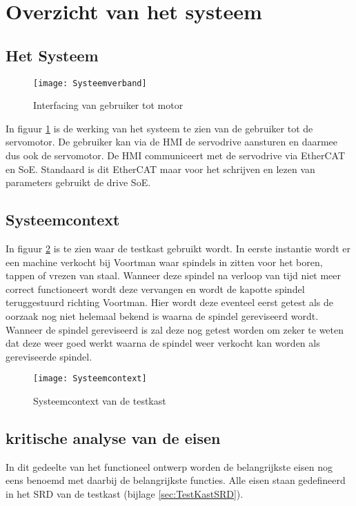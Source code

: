 \section{Overzicht van het systeem}

\subsection{Het Systeem}

\begin{figure}[H]
	\centering
	\texttt{[image: Systeemverband]}
	\label{fig:SysteemVerband}
	\caption{Interfacing van gebruiker tot motor}
\end{figure}

In figuur \ref{fig:SysteemVerband} is de werking van het systeem te zien van de gebruiker tot de servomotor. De gebruiker kan via de \gls{HMI} de servodrive aansturen en daarmee dus ook de servomotor. De \gls{HMI} communiceert met de servodrive via \gls{EtherCAT} en \gls{SoE}. Standaard is dit \gls{EtherCAT} maar voor het schrijven en lezen van parameters gebruikt de drive \gls{SoE}.

\newpage

\subsection{Systeemcontext}

In figuur \ref{fig:Systeemcontext} is te zien waar de testkast gebruikt wordt. In eerste instantie wordt er een machine verkocht bij Voortman waar spindels in zitten voor het boren, tappen of vrezen van staal. Wanneer deze spindel na verloop van tijd niet meer correct functioneert wordt deze vervangen en wordt de kapotte spindel teruggestuurd richting Voortman. Hier wordt deze eventeel eerst getest als de oorzaak nog niet helemaal bekend is waarna de spindel gereviseerd wordt. Wanneer de spindel gereviseerd is zal deze nog getest worden om zeker te weten dat deze weer goed werkt waarna de spindel weer verkocht kan worden als gereviseerde spindel.

\begin{figure}[H]
	\centering
	\texttt{[image: Systeemcontext]}
	\label{fig:Systeemcontext}
	\caption{Systeemcontext van de testkast}
\end{figure}

\newpage

\subsection{kritische analyse van de eisen}

In dit gedeelte van het functioneel ontwerp worden de belangrijkste eisen nog eens benoemd met daarbij de belangrijkste functies. Alle eisen staan gedefineerd in het SRD van de testkast (bijlage \ref{sec:TestKastSRD}).